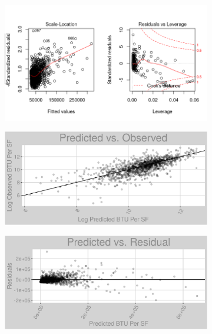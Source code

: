 \begin{figure}[h]
\begin{subfigure}{1\textwidth}
\includegraphics[width=.99\textwidth, height=0.3\textheight]{Images/electricity_psf_nn_full_resid_2.png}
\end{subfigure}
\begin{subfigure}{1\textwidth}
\centering
\includegraphics[width=.99\textwidth, height=0.3\textheight]{Images/electricity_psf_nn_full_pvo.png}
\end{subfigure}
\begin{subfigure}{1\textwidth}
\centering
\includegraphics[width=.99\textwidth, height=0.3\textheight]{Images/electricity_psf_nn_full_pvr.png}
\end{subfigure}
\end{figure}
